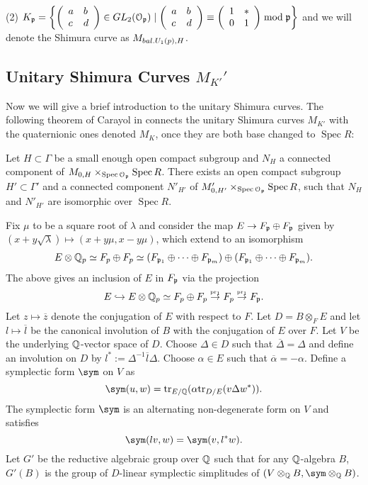 \documentclass{amsart}
\newcommand{\inj}{\hookrightarrow}
\newcommand{\ov}[1]{\overline{#1}}
\numberwithin{equation}{section}
\def \mb{\mbox}
\DeclareMathOperator{\Spec}{\mathrm{Spec}}
\begin{document}
(2) $K_{\mathfrak{p}}= \left\{\left(\begin{array}{ll} a & b \\ c & d
 \end{array}\right)  \in GL_2(\mathcal{O}_{\mathfrak{p}}) \mid 
\left(\begin{array}{ll} a & b \\ c & d \end{array}\right) \equiv
\left(\begin{array}{ll} 1 & * \\ 0 & 1 \end{array}\right) 
\bmod \mathfrak{p} \right\} $
and we will denote the Shimura curve as $M_{bal.U_1(p),H}$.


\subsection{Unitary Shimura Curves $M_{K'}'$}
Now we will give a brief introduction to the unitary Shimura curves. The 
following theorem of Carayol in \cite{MR860139} connects the unitary Shimura 
curves $M_{K'}$ with the quaternionic ones denoted $M_K$, once they are 
both base changed to $\Spec R$:


\begin{thm}[Carayol]
\label{Carayol}
Let $H \subset \Gamma$ be a small enough open compact subgroup and $N_H$ a 
connected
component of $M_{0,H} \times_{\Spec \Ou_\gp} \Spec R$. There exists an open 
compact subgroup 
$H' \subset {\Gamma}'$
and a connected component $N'_{H'}$ of $M'_{0,H'} \times_{\Spec \Ou_\gp} 
\Spec R$, such that $N_H$ and $N'_{H'}$ are isomorphic over $\Spec R$.
\end{thm}


Fix $\mu$ to be a square root of $\lambda$ and consider the map $E \rightarrow 
F_{\mathfrak{p}} \oplus F_{\mathfrak{p}}$ given by $(x+y\sqrt \lambda) \mapsto (x+y\mu, x-y\mu)$, 
which extend to an isomorphism 
\begin{align}
\label{ringiso}
E \otimes \mathbb{Q}_p \simeq F_p \oplus F_p \simeq (F_{\mathfrak{p}_1} \oplus \cdots \oplus
F_{\mathfrak{p}_m}) \oplus (F_{\mathfrak{p}_1} \oplus \cdots \oplus F_{\mathfrak{p}_m}).
\end{align}
The above gives an inclusion of $E$ in $F_{\mathfrak{p}}$ via the projection
$$E \inj E\otimes \Q_p \simeq F_p \oplus F_p \stk{\tiny \mb{pr}_1}{\map} F_p 
\stk{\tiny \mb{pr}_1}{\map} F_\gp.$$
Let $z \mapsto \overline{z}$ denote the conjugation of $E$ with respect to $F$.
Let $D=B \otimes_F E$ and let $l \mapsto \overline{l}$ be the canonical 
involution of $B$ with the conjugation of $E$ over $F$. Let $V$ be the 
underlying $\mathbb{Q}$-vector space of $D$. Choose $\Delta \in D$ such that 
$\ov{\Delta} = \Delta$ and define an involution on $D$ by $l^*:= 
\Delta^{-1} \ov{l} \Delta$. Choose $\alpha \in E$ such that $\ov{\alpha} = 
-\alpha$. Define a symplectic form $\sym$ on $V$ as 
$$\sym(u,w) = \mb{tr}_{E/\Q}(\alpha \mb{tr}_{D/E}(v\Delta w^*)).$$ 
The symplectic form $\sym$ is an alternating non-degenerate form on $V$ and
satisfies 
$$\sym(lv,w) = \sym(v,l^*w).$$
Let $G'$ be the reductive algebraic group over $\mathbb{Q}$ such that for any 
$\mathbb{Q}$-algebra $B$, $G'(B)$ is the group of $D$-linear symplectic simplitudes
of $(V\otimes_\Q B, \sym\otimes_\Q B)$.
\end{document}
